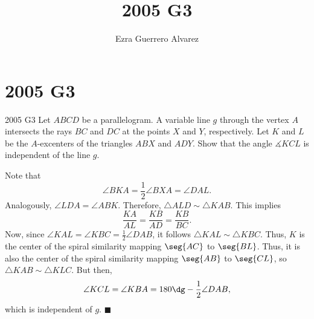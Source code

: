 \documentclass[14pt]{article}
\title{2005 G3}
\author{Ezra Guerrero Alvarez}
\begin{document}
\maketitle
	
\section*{2005 G3}

\begin{statement}{2005 G3}
	Let $ABCD$ be a parallelogram. A variable line $g$ through the vertex $A$ intersects the rays $BC$ and $DC$ at the points $X$ and $Y$, respectively. Let $K$ and $L$ be the $A$-excenters of the triangles $ABX$ and $ADY$. Show that the angle $\measuredangle KCL$ is independent of the line $g$.
\end{statement}
Note that
\[ \angle BKA =\frac12\angle BXA = \angle DAL. \]
Analogously, $\angle LDA = \angle ABK$. Therefore, $\triangle ALD\sim\triangle KAB$. This implies
\[ \frac{KA}{AL}=\frac{KB}{AD}=\frac{KB}{BC}. \]
Now, since $\angle KAL = \angle KBC = \frac12\angle DAB$, it follows $\triangle KAL\sim\triangle KBC$. Thus, $K$ is the center of the spiral similarity mapping $\seg{AC}$ to $\seg{BL}$. Thus, it is also the center of the spiral similarity mapping $\seg{AB}$ to $\seg{CL}$, so $\triangle KAB\sim\triangle KLC$. But then,
\[ \angle KCL = \angle KBA = 180\dg-\frac12\angle DAB, \]
which is independent of $g$. $\blacksquare$
	
\end{document}
